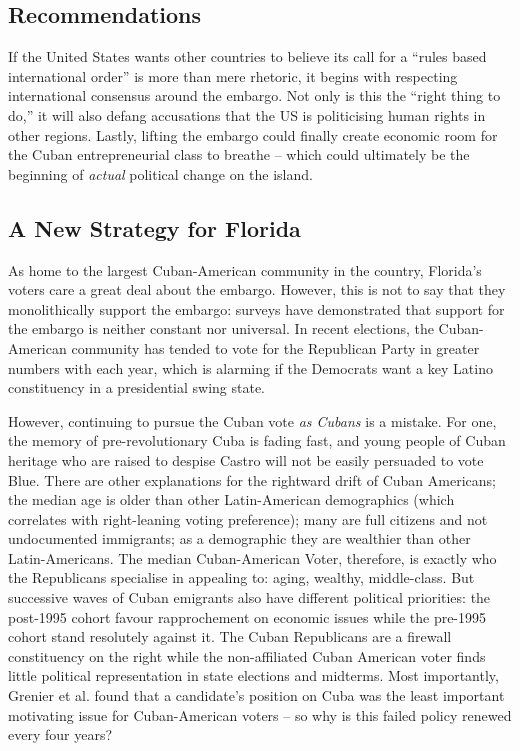 \documentclass[letterpaper,12pt,twoside]{article} %
\begin{document}
\begin{multicols}{2}
\vfill
\pagebreak
\section{Recommendations}

If the United States wants other countries to believe its call for a ``rules based international order'' is more than mere rhetoric, it begins with respecting international consensus around the embargo. Not only is this the ``right thing to do,'' it will also defang accusations that the US is politicising human rights in other regions. Lastly, lifting the embargo could finally create economic room for the Cuban entrepreneurial class to breathe -- which could ultimately be the beginning of \textit{actual} political change on the island.

\subsection*{A New Strategy for Florida}

As home to the largest Cuban-American community in the country, Florida's voters care a great deal about the embargo. However, this is not to say that they monolithically support the embargo: surveys have demonstrated that support for the embargo is neither constant\autocite{symbolic2010girard} nor universal.\autocite{grenier20182018} In recent elections, the Cuban-American community has tended to vote for the Republican Party in greater numbers with each year\autocite{krogstad_2021}, which is alarming if the Democrats want a key Latino constituency in a presidential swing state.

However, continuing to pursue the Cuban vote \textit{as Cubans} is a mistake. For one, the memory of pre-revolutionary Cuba is fading fast, and young people of Cuban heritage who are raised to despise Castro will not be easily persuaded to vote Blue. There are other explanations for the rightward drift of Cuban Americans; the median age is older than other Latin-American demographics (which correlates with right-leaning voting preference); many are full citizens and not undocumented immigrants; as a demographic they are wealthier than other Latin-Americans.\autocite{noe-bustamante2019pew} The median Cuban-American Voter, therefore, is exactly who the Republicans specialise in appealing to: aging, wealthy, middle-class. But successive waves of Cuban emigrants also have different political priorities: the post-1995 cohort favour rapprochement on economic issues while the pre-1995 cohort stand resolutely against it.\autocite{grenier20182018} The Cuban Republicans are a firewall constituency on the right while the non-affiliated Cuban American voter finds little political representation in state elections and midterms. Most importantly, Grenier et al. found that a candidate's position on Cuba was the least important motivating issue for Cuban-American voters -- so why is this failed policy renewed every four years?


\end{multicols}
\end{document}
